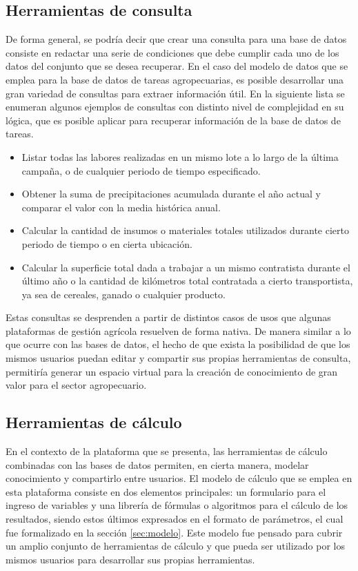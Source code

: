 \subsection{Herramientas de consulta} \label{sec:db_query}
De forma general, se podría decir que crear una consulta para una base de datos consiste en redactar una serie de condiciones que debe cumplir cada uno de los datos del conjunto que se desea recuperar. En el caso del modelo de datos que se emplea para la base de datos de tareas agropecuarias, es posible desarrollar una gran variedad de consultas para extraer información útil. En la siguiente lista se enumeran algunos ejemplos de consultas con distinto nivel de complejidad en su lógica, que es posible aplicar para recuperar información de la base de datos de tareas.

\begin{itemize}
    \item Listar todas las labores realizadas en un mismo lote a lo largo de la última campaña, o de cualquier periodo de tiempo especificado.
    \item Obtener la suma de precipitaciones acumulada durante el año actual y comparar el valor con la media histórica anual.
    \item Calcular la cantidad de insumos o materiales totales utilizados durante cierto periodo de tiempo o en cierta ubicación.
    \item Calcular la superficie total dada a trabajar a un mismo contratista durante el último año o la cantidad de kilómetros total contratada a cierto transportista, ya sea de cereales, ganado o cualquier producto.
\end{itemize}

Estas consultas se desprenden a partir de distintos casos de usos que algunas plataformas de gestión agrícola resuelven de forma nativa. De manera similar a lo que ocurre con las bases de datos, el hecho de que exista la posibilidad de que los mismos usuarios puedan editar y compartir sus propias herramientas de consulta, permitiría generar un espacio virtual para la creación de conocimiento de gran valor para el sector agropecuario.

\subsection{Herramientas de cálculo} \label{sec:calculos}
En el contexto de la plataforma que se presenta, las herramientas de cálculo combinadas con las bases de datos permiten, en cierta manera, modelar conocimiento y compartirlo entre usuarios. El modelo de cálculo que se emplea en esta plataforma consiste en dos elementos principales: un formulario para el ingreso de variables y una librería de fórmulas o algoritmos para el cálculo de los resultados, siendo estos últimos expresados en el formato de parámetros, el cual fue formalizado en la sección \ref{sec:modelo}. Este modelo fue pensado para cubrir un amplio conjunto de herramientas de cálculo y que pueda ser utilizado por los mismos usuarios para desarrollar sus propias herramientas.

